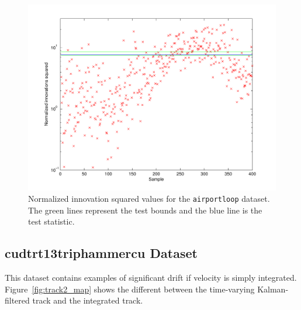 \begin{figure}
\includegraphics[width=\columnwidth]{nis}
\caption{Normalized innovation squared values for the \texttt{airportloop} dataset.  The green lines represent the test bounds and the blue line is the test statistic.}
\label{fig:nis}
\end{figure}

\subsection{cudtrt13triphammercu Dataset}
This dataset contains examples of significant drift if velocity is simply integrated.  Figure~\ref{fig:track2_map} shows the different between the time-varying Kalman-filtered track and the integrated track.

